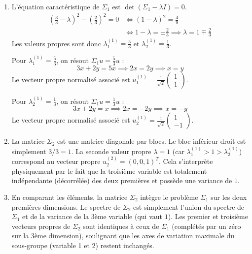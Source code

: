 \documentclass[solutions]{../exercices}
\begin{document}
\begin{solution}
	\begin{enumerate}
		\item L'équation caractéristique de $\Sigma_1$ est $\det(\Sigma_1 - \lambda I) = 0$.
		\begin{align*}
			\left(\frac{3}{3} - \lambda\right)^2 - \left(\frac{2}{3}\right)^2 = 0 &\iff (1 - \lambda)^2 = \frac{4}{9} \\
			&\iff 1 - \lambda = \pm \frac{2}{3} \implies \lambda = 1 \mp \frac{2}{3}
		\end{align*}
		Les valeurs propres sont donc $\lambda_1^{(1)} = \frac{5}{3}$ et $\lambda_2^{(1)} = \frac{1}{3}$.

		Pour $\lambda_1^{(1)} = \frac{5}{3}$, on résout $\Sigma_1 u = \frac{5}{3} u$ :
		\[ 3x + 2y = 5x \implies 2x = 2y \implies x = y \]
		Le vecteur propre normalisé associé est $u_1^{(1)} = \frac{1}{\sqrt{2}}\begin{pmatrix}1 \\ 1\end{pmatrix}$.

		Pour $\lambda_2^{(1)} = \frac{1}{3}$, on résout $\Sigma_1 u = \frac{1}{3} u$ :
		\[ 3x + 2y = x \implies 2x = -2y \implies x = -y \]
		Le vecteur propre normalisé associé est $u_2^{(1)} = \frac{1}{\sqrt{2}}\begin{pmatrix}1 \\ -1\end{pmatrix}$.

		\item La matrice $\Sigma_2$ est une matrice diagonale par blocs. Le bloc inférieur droit est simplement $3/3 = 1$. La seconde valeur propre $\lambda = 1$ (car $\lambda_1^{(1)} > 1 > \lambda_2^{(1)}$) correspond au vecteur propre $u_2^{(2)} = (0, 0, 1)^T$. 
		Cela s'interprète physiquement par le fait que la troisième variable est totalement indépendante (décorrélée) des deux premières et possède une variance de $1$.

		\item En comparant les éléments, la matrice $\Sigma_2$ intègre le problème $\Sigma_1$ sur les deux premières dimensions. Le spectre de $\Sigma_2$ est simplement l'union du spectre de $\Sigma_1$ et de la variance de la 3ème variable (qui vaut $1$). Les premier et troisième vecteurs propres de $\Sigma_2$ sont identiques à ceux de $\Sigma_1$ (complétés par un zéro sur la 3ème dimension), soulignant que les axes de variation maximale du sous-groupe (variable 1 et 2) restent inchangés.
	\end{enumerate}
\end{solution}
\end{document}
